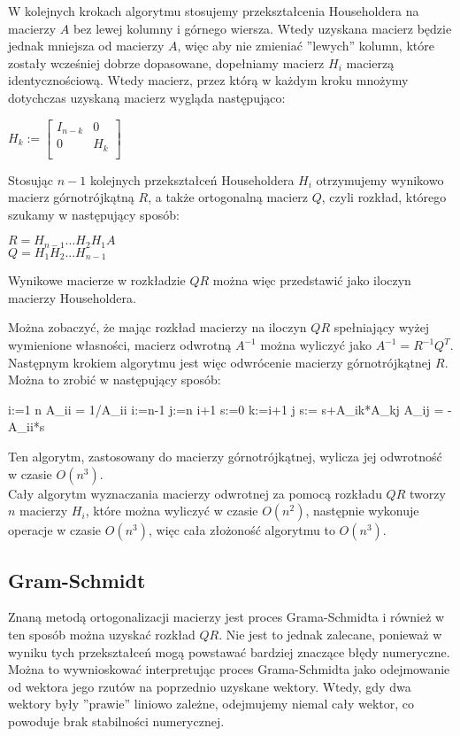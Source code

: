 \documentclass[11pt]{article}
\begin{document}
W kolejnych krokach algorytmu 
stosujemy przekształcenia Householdera na macierzy $A$ bez lewej kolumny i górnego wiersza.
Wtedy uzyskana macierz będzie jednak mniejsza od macierzy $A$, więc aby nie zmieniać ''lewych'' kolumn,
które zostały wcześniej dobrze dopasowane, dopełniamy macierz $H_i$ macierzą identycznościową.
Wtedy macierz, przez którą w każdym kroku mnożymy dotychczas uzyskaną macierz wygląda następująco:
\begin{center}
\begin{math}
H_k :=
\begin{bmatrix}
    I_{n-k} & 0 \\
    0 & H_k \\
\end{bmatrix}
\end{math}
\end{center}

Stosując $n-1$ kolejnych przekształceń Householdera $H_i$ otrzymujemy wynikowo macierz górnotrójkątną $R$, 
a także ortogonalną macierz $Q$, czyli rozkład, którego szukamy w następujący sposób:
\begin{center}
$R = H_{n-1}...H_2H_1A $ \\
$Q = H_1H_2...H_{n-1}$
\end{center}

Wynikowe macierze w rozkładzie $QR$ można więc przedstawić jako iloczyn macierzy Householdera.

Można zobaczyć, że mając rozkład macierzy na iloczyn $QR$ spełniający wyżej wymienione własności,
macierz odwrotną $A^{-1}$ można wyliczyć jako $A^{-1}=R^{-1}Q^T$. Następnym krokiem algorytmu jest więc
odwrócenie macierzy górnotrójkątnej $R$. Można to zrobić w następujący sposób:\\
\begin{program}
  \FOR i:=1 \TO n \DO
	A_{ii} = 1/A_{ii}
  \FOR i:=n-1   \DO
	\FOR j:=n  \TO i+1 \DO
	  s:=0
	  \FOR k:=i+1 \TO j \DO
	    s:= s+A_{ik}*A_{kj}
	  A_{ij} = - A_{ii}*s
\end{program}

Ten algorytm, zastosowany do macierzy górnotrójkątnej, wylicza jej odwrotność w czasie $O(n^3)$.\\

Cały algorytm wyznaczania macierzy odwrotnej za pomocą rozkładu $QR$ tworzy $n$ macierzy $H_i$, 
które można wyliczyć w czasie $O(n^2)$, następnie wykonuje operacje w czasie $O(n^3)$,
więc cała złożoność algorytmu to $O(n^3)$.

\subsection{Gram-Schmidt}
Znaną metodą ortogonalizacji macierzy jest proces Grama-Schmidta i również w ten sposób można uzyskać rozkład $QR$.
Nie jest to jednak zalecane, ponieważ w wyniku tych przekształceń mogą powstawać bardziej znaczące błędy numeryczne.
Można to wywnioskować interpretując proces Grama-Schmidta jako odejmowanie od wektora jego rzutów na poprzednio
uzyskane wektory. Wtedy, gdy dwa wektory były ''prawie'' liniowo zależne, odejmujemy niemal cały wektor, co powoduje
brak stabilności numerycznej.\\ 
\end{document}
